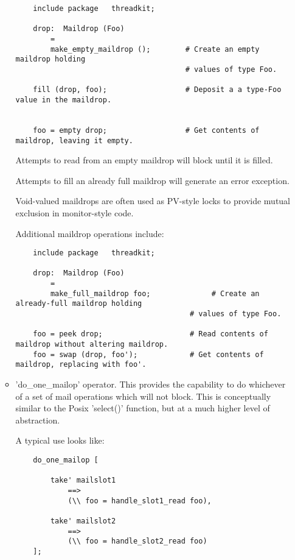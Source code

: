 \begin{itemize}
\begin{itemize}
\begin{verbatim}
    include package   threadkit;

    drop:  Maildrop (Foo)
        =
        make_empty_maildrop ();        # Create an empty maildrop holding
                                       # values of type Foo.

    fill (drop, foo);                  # Deposit a a type-Foo value in the maildrop.


    foo = empty drop;                  # Get contents of maildrop, leaving it empty.
\end{verbatim}

Attempts to read from an empty maildrop will 
block until it is filled.

Attempts to fill an already full maildrop 
will generate an error exception.

Void-valued maildrops are often used as 
PV-style locks to provide mutual exclusion 
in monitor-style code.

Additional maildrop operations include:

\begin{verbatim}
    include package   threadkit;

    drop:  Maildrop (Foo)
        =
        make_full_maildrop foo;              # Create an already-full maildrop holding
                                        # values of type Foo.

    foo = peek drop;                    # Read contents of maildrop without altering maildrop.
    foo = swap (drop, foo');            # Get contents of maildrop, replacing with foo'.
\end{verbatim}

\item 
'do\_one\_mailop' operator.  This provides the 
capability to do whichever of a set of 
mail operations which will not block. 
This is conceptually similar to the Posix 
'select()' function, but at a much higher 
level of abstraction.

A typical use looks like:

\begin{verbatim}
    do_one_mailop [

        take' mailslot1
            ==>
            (\\ foo = handle_slot1_read foo),

        take' mailslot2
            ==>
            (\\ foo = handle_slot2_read foo)
    ];
\end{verbatim}


\end{itemize}
\end{itemize}
